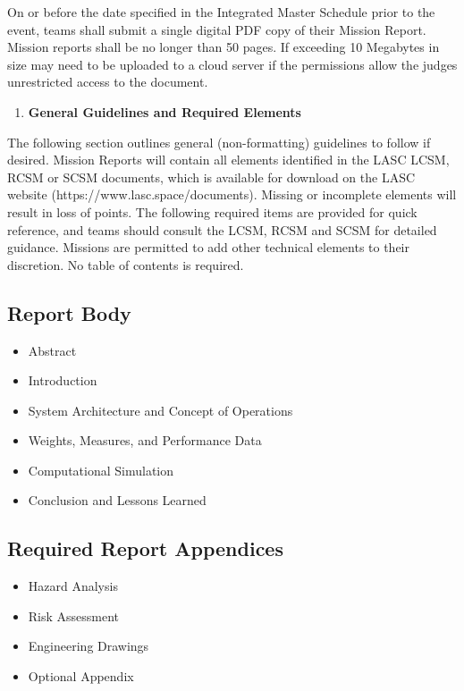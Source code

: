 \documentclass[
]{article}
\begin{document}
On or before the date specified in the Integrated Master Schedule prior
to the event, teams shall submit a single digital PDF copy of their
Mission Report. Mission reports shall be no longer than 50 pages. If
exceeding 10 Megabytes in size may need to be uploaded to a cloud server
if the permissions allow the judges unrestricted access to the document.

\begin{enumerate}
\def\labelenumi{\arabic{enumi}.}
\setcounter{enumi}{2}
\item
  \textbf{General Guidelines and Required Elements}
\end{enumerate}

The following section outlines general (non-formatting) guidelines to
follow if desired. Mission Reports will contain all elements identified
in the LASC LCSM, RCSM or SCSM documents, which is available for
download on the LASC website (https://www.lasc.space/documents). Missing
or incomplete elements will result in loss of points. The following
required items are provided for quick reference, and teams should
consult the LCSM, RCSM and SCSM for detailed guidance. Missions are
permitted to add other technical elements to their discretion. No table
of contents is required.

\subsection{Report Body}\label{report-body}

\begin{itemize}
\item
  Abstract
\item
  Introduction
\item
  System Architecture and Concept of Operations
\item
  Weights, Measures, and Performance Data
\item
  Computational Simulation
\item
  Conclusion and Lessons Learned
\end{itemize}

\subsection{Required Report
Appendices}\label{required-report-appendices}

\begin{itemize}
\item
  Hazard Analysis
\item
  Risk Assessment
\item
  Engineering Drawings
\item
  Optional Appendix
\end{itemize}
\end{document}
